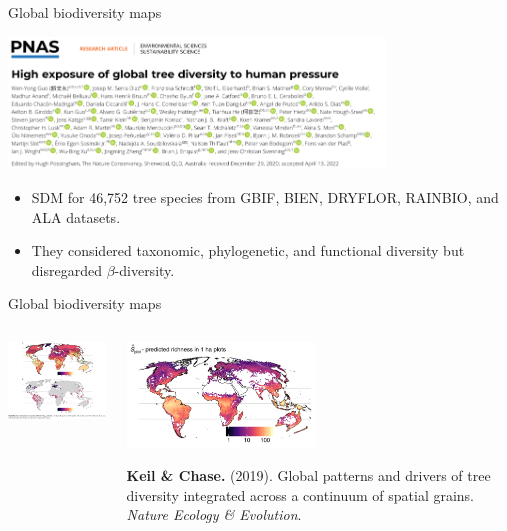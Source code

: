\documentclass[10pt,table,dvipsnames,compress]{beamer}
\begin{document}
\begin{frame}[label={sec:orga56e64c}]{Global biodiversity maps}
\begin{center}
\includegraphics[width=10cm]{figs/biodiv/Guo2022-title.png}
\end{center}

\begin{itemize}
\item SDM for 46,752 tree species from GBIF, BIEN, DRYFLOR, RAINBIO, and ALA datasets.
\item They considered taxonomic, phylogenetic, and functional diversity but disregarded \(\beta\)-diversity.
\end{itemize}
\end{frame}

\begin{frame}[label={sec:orga91c7e6}]{Global biodiversity maps}
\begin{columns}
\begin{column}{0.5\columnwidth}
\begin{center}
\includegraphics[width=6cm]{figs/biodiv/Keil2019-figure.png}
\end{center}
\end{column}

\begin{column}{0.5\columnwidth}
\begin{center}
\includegraphics[width=5cm]{figs/biodiv/Keil2019-figure-2.png}
\end{center}

\textbf{Keil \& Chase.} (2019). Global patterns and drivers of tree diversity integrated across a continuum of spatial grains. \emph{Nature Ecology \& Evolution}.
\end{column}
\end{columns}
\end{frame}
\end{document}
